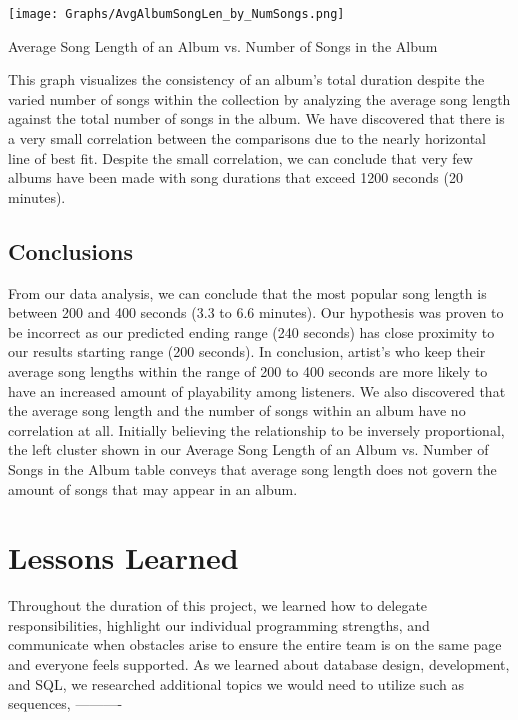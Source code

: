 \documentclass[12pt]{article}
\begin{document}
    \begin{center}
            \texttt{[image: Graphs/AvgAlbumSongLen\_by\_NumSongs.png]}
            \caption{Average Song Length of an Album vs. Number of Songs in the Album}
            \label{fig:Graph 3}
    \end{center}



    \vspace{0.5cm}

    \noindent This graph visualizes the consistency of an album's total duration
    despite the varied number of songs within the collection by analyzing the average
    song length against the total number of songs in the album. We have discovered
    that there is a very small correlation between the comparisons due to the nearly
    horizontal line of best fit. Despite the small correlation, we can conclude that
    very few albums have been made with song durations that exceed 1200 seconds
    (20 minutes).


    \subsection{Conclusions}
    From our data analysis, we can conclude that the most popular song length is
    between 200 and 400 seconds (3.3 to 6.6 minutes). Our hypothesis was proven to
    be incorrect as our predicted ending range (240 seconds) has close proximity to
    our results starting range (200 seconds). In conclusion, artist's who keep their
    average song lengths within the range of 200 to 400 seconds are more likely to have
    an increased amount of playability among listeners. We also discovered that the
    average song length and the number of songs within an album have no correlation
    at all. Initially believing the relationship to be inversely proportional, the
    left cluster shown in our Average Song Length of an Album vs. Number of Songs
    in the Album table conveys that average song length does not govern the
    amount of songs that may appear in an album.

    \section{Lessons Learned}
    Throughout the duration of this project, we learned how to delegate responsibilities,
    highlight our individual programming strengths, and communicate when obstacles arise
    to ensure the entire team is on the same page and everyone feels supported. As we
    learned about database design, development, and SQL, we researched additional topics
    we would need to utilize such as sequences, ----------
\end{document}
